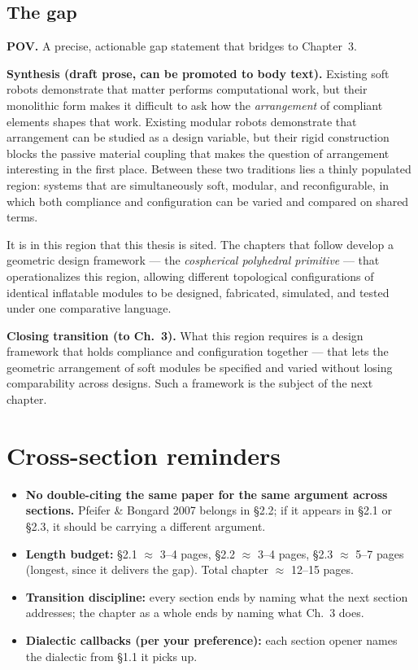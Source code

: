 \subsection{The gap}
\label{subsec:gap}

\textbf{POV.} A precise, actionable gap statement that bridges
to Chapter~3.

\textbf{Synthesis (draft prose, can be promoted to body text).}
Existing soft robots demonstrate that matter performs computational
work, but their monolithic form makes it difficult to ask how the
\emph{arrangement} of compliant elements shapes that work. Existing
modular robots demonstrate that arrangement can be studied as a
design variable, but their rigid construction blocks the passive
material coupling that makes the question of arrangement interesting
in the first place. Between these two traditions lies a thinly
populated region: systems that are simultaneously soft, modular, and
reconfigurable, in which both compliance and configuration can be
varied and compared on shared terms.

It is in this region that this thesis is sited. The chapters that
follow develop a geometric design framework --- the \emph{cospherical
polyhedral primitive} --- that operationalizes this region, allowing
different topological configurations of identical inflatable modules
to be designed, fabricated, simulated, and tested under one
comparative language.

\textbf{Closing transition (to Ch.\ 3).} What this region requires
is a design framework that holds compliance and configuration
together --- that lets the geometric arrangement of soft modules be
specified and varied without losing comparability across designs.
Such a framework is the subject of the next chapter.

\section*{Cross-section reminders}
\label{sec:reminders}

\begin{itemize}
    \item \textbf{No double-citing the same paper for the same argument
          across sections.} Pfeifer \& Bongard 2007 belongs in \S2.2;
          if it appears in \S2.1 or \S2.3, it should be carrying a
          different argument.
    \item \textbf{Length budget:} \S2.1 $\approx$ 3--4 pages, \S2.2 $\approx$
          3--4 pages, \S2.3 $\approx$ 5--7 pages (longest, since it
          delivers the gap). Total chapter $\approx$ 12--15 pages.
    \item \textbf{Transition discipline:} every section ends by naming
          what the next section addresses; the chapter as a whole
          ends by naming what Ch.~3 does.
    \item \textbf{Dialectic callbacks (per your preference):} each
          section opener names the dialectic from \S1.1 it picks up.
\end{itemize}

